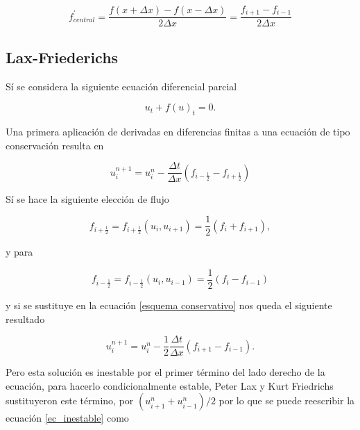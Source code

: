 \documentclass[12pt,a4paper]{book}
\begin{document}
\begin{equation} \label{Centrada}
f_{central}^{'}=\frac{f\left(x + \Delta x\right) - f(x - \Delta x) }{2\Delta x}=\frac{f_{i+1}-f_{i-1}}{2 \Delta x}
\end{equation}



\subsection{Lax-Friederichs}

Sí se considera la siguiente ecuación diferencial parcial \citep{Duchateau2002}

\begin{equation} \label{ecu_conser}
u_t+ f\left(u \right)_t=0.
\end{equation}

\noindent Una primera aplicación de derivadas en diferencias finitas a una ecuación de tipo conservación resulta en 

\begin{equation}\label{esquema conservativo}
u_i^{n+1} = u_i^{n} -\frac{\Delta t}{\Delta x} \left(f_{i-\frac{1}{2}} - f_{i+\frac{1}{2}}\right)
\end{equation}



\noindent Sí se hace la siguiente elección de flujo 

\begin{equation}
f_{i+\frac{1}{2}} = f_{i+\frac{1}{2}} \left(
u_{i} , u_{i+1}\right) =\frac{1}{2} \left(f_{i} + f_{i+1} \right), 
\end{equation}

\noindent y para 

\begin{equation}
f_{i-\frac{1}{2}} = f_{i-\frac{1}{2}} \left(
u_{i} , u_{i-1}\right) =\frac{1}{2} \left(f_{i} - f_{i-1} \right) 
\end{equation}

\noindent y si se sustituye en la ecuación \ref{esquema conservativo} nos queda el siguiente resultado

\begin{equation}\label{ec_inestable}
u_i^{n+1} = u_i^{n} - \frac{1}{2}\frac{\Delta t}{\Delta x} \left(f_{i+1} - f_{i-1} \right).
\end{equation}

\noindent Pero esta solución es inestable por el primer término del lado derecho de la ecuación, para hacerlo 
condicionalmente estable, Peter Lax y Kurt Friedrichs sustituyeron este término, por $(u_{i+1}^n+u_{i-1}^n)/2$  por lo que se puede reescribir la ecuación \ref{ec_inestable} como
\end{document}
